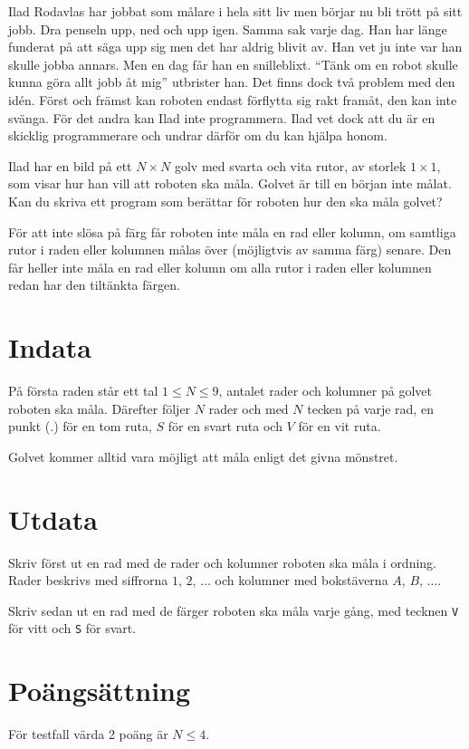Ilad Rodavlas har jobbat som målare i hela sitt liv men börjar nu bli trött på sitt jobb.
Dra penseln upp, ned och upp igen.
Samma sak varje dag.
Han har länge funderat på att säga upp sig men det har aldrig blivit av.
Han vet ju inte var han skulle jobba annars.
Men en dag får han en snilleblixt.
``Tänk om en robot skulle kunna göra allt jobb åt mig'' utbrister han.
Det finns dock två problem med den  idén.
Först och främst kan roboten endast förflytta sig rakt framåt, den kan inte svänga.
För det andra kan Ilad inte programmera.
Ilad vet dock att du är en skicklig programmerare och undrar därför om du kan hjälpa honom. 

Ilad har en bild på ett $N \times N$ golv med svarta och vita rutor, av storlek $1 \times 1$, som visar hur han vill att roboten ska måla.
Golvet är till en början inte målat.
Kan du skriva ett program som berättar för roboten hur den ska måla golvet?

För att inte slösa på färg får roboten inte måla en rad eller kolumn, om samtliga rutor i raden eller kolumnen målas över (möjligtvis av samma färg) senare.
Den får heller inte måla en rad eller kolumn om alla rutor i raden eller kolumnen redan har den tiltänkta färgen.

\section*{Indata}
På första raden står ett tal $1 \leq N \leq 9$, antalet rader och kolumner på golvet roboten ska måla. Därefter följer $N$ rader och med $N$ tecken på varje rad, en punkt ($.$) för en tom ruta, $S$ för en svart ruta och $V$ för en vit ruta.

Golvet kommer alltid vara möjligt att måla enligt det givna mönstret. 

\section*{Utdata}
Skriv först ut en rad med de rader och kolumner roboten ska måla i ordning.
Rader beskrivs med siffrorna $1$, $2$, $\dots$ och kolumner med bokstäverna $A$, $B$, $\dots$.

Skriv sedan ut en rad med de färger roboten ska måla varje gång, med tecknen \texttt{V} för vitt och \texttt{S} för svart.

\section*{Poängsättning}
För testfall värda 2 poäng är $N \le 4$.
